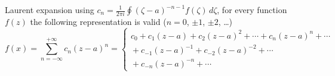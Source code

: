 \documentclass{article}
\begin{document}
\noindent
Laurent expansion using $c_n = \frac{1}{2\pi i}
\oint (\zeta-a)^{-n-1}f(\zeta)\,d\zeta$, for every function $f(z)$ the
following representation is valid ($n=0$, $\pm1$, $\pm2$, \ldots)
\[ f(x) = \sum_{n=-\infty}^{+\infty} c_n(z-a)^n
	= \left\{\begin{array}{r}
	  c_0 + c_1(z-a) + c_2(z-a)^2 +\cdots+ c_n(z-a)^n+\cdots\\
	  \mbox{}+c_{-1}(z-a)^{-1} + c_{-2}(z-a)^{-2}+\cdots\\
	  \mbox{}+c_{-n}(z-a)^{-n}+\cdots \end{array}\right. \]
\end{document}
